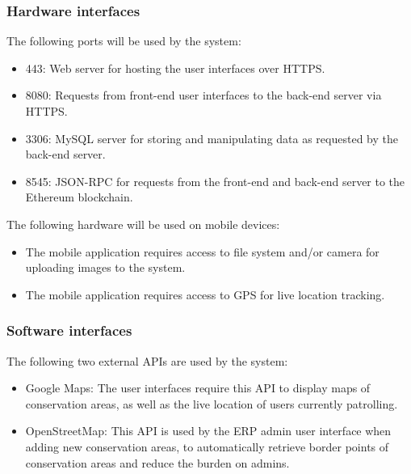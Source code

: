\documentclass{article}
\begin{document}
\subsubsection{Hardware interfaces}
The following ports will be used by the system:
\begin{itemize}
\item 443: Web server for hosting the user interfaces over HTTPS.
\item 8080: Requests from front-end user interfaces to the back-end server via HTTPS.
\item 3306: MySQL server for storing and manipulating data as requested by the back-end server.
\item 8545: JSON-RPC for requests from the front-end and back-end server to the Ethereum blockchain.
\end{itemize}

The following hardware will be used on mobile devices:
\begin{itemize}
\item The mobile application requires access to file system and/or camera for uploading images to the system.
\item The mobile application requires access to GPS for live location tracking.
\end{itemize}

\subsubsection{Software interfaces}
The following two external APIs are used by the system:
\begin{itemize}
\item Google Maps: The user interfaces require this API to display maps of conservation areas, as well as the live location of users currently patrolling.
\item OpenStreetMap: This API is used by the ERP admin user interface when adding new conservation areas, to automatically retrieve border points of conservation areas and reduce the burden on admins.
\end{itemize}
\end{document}
